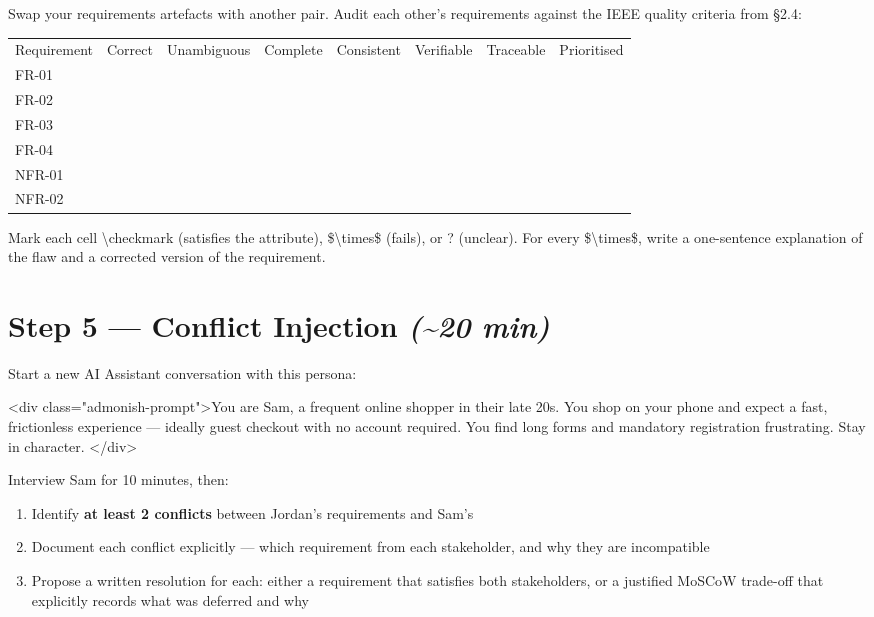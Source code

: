\documentclass[11pt,a4paper]{book}
\begin{document}
Swap your requirements artefacts with another pair. Audit each other's requirements against the IEEE quality criteria from §2.4:

\begin{tabular}{llllllll}
\hline
Requirement & Correct & Unambiguous & Complete & Consistent & Verifiable & Traceable & Prioritised \\
FR-01 &  &  &  &  &  &  &  \\
FR-02 &  &  &  &  &  &  &  \\
FR-03 &  &  &  &  &  &  &  \\
FR-04 &  &  &  &  &  &  &  \\
NFR-01 &  &  &  &  &  &  &  \\
NFR-02 &  &  &  &  &  &  &  \\
\hline
\end{tabular}

Mark each cell \textbackslash{}checkmark{} (satisfies the attribute), \$\textbackslash{}times\$ (fails), or ? (unclear). For every \$\textbackslash{}times\$, write a one-sentence explanation of the flaw and a corrected version of the requirement.

\medskip

\section{Step 5 --- Conflict Injection \textit{(\textasciitilde{}20 min)}}

Start a new AI Assistant conversation with this persona:

<div class="admonish-prompt">You are Sam, a frequent online shopper in their late 20s. You shop on your phone and expect a fast, frictionless experience --- ideally guest checkout with no account required. You find long forms and mandatory registration frustrating. Stay in character.
</div>

Interview Sam for 10 minutes, then:

\begin{enumerate}
  \item Identify \textbf{at least 2 conflicts} between Jordan's requirements and Sam's
  \item Document each conflict explicitly --- which requirement from each stakeholder, and why they are incompatible
  \item Propose a written resolution for each: either a requirement that satisfies both stakeholders, or a justified MoSCoW trade-off that explicitly records what was deferred and why
\end{enumerate}
\end{document}
